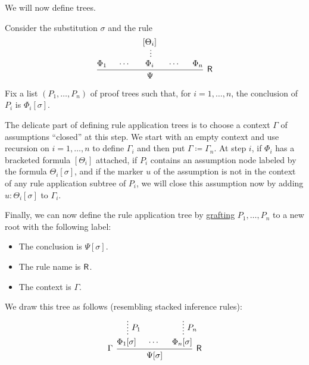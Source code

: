 \begin{definition}
\begin{thmenum}[resume=def:natural_deduction_proof_tree]
     We will now define  trees.

    Consider the substitution \( \sigma \) and the rule
    \begin{equation*}
      \begin{prooftree}
        \hypo{ \Phi_1 }
        \hypo{ \cdots }
        \hypo{ [\Theta_i] }
        \ellipsis {} { \Phi_i }
        \hypo{ \cdots }
        \hypo{ \Phi_n }
        \infer5[\logic{R}]{ \Psi }
      \end{prooftree}
    \end{equation*}

    Fix a list \( (P_1, \ldots, P_n) \) of proof trees such that, for \( i = 1, \ldots, n \), the conclusion of \( P_i \) is \( \Phi_i[\sigma] \).

    The delicate part of defining rule application trees is to choose a context \( \Gamma \) of assumptions \enquote{closed} at this step. We start with an empty context and use recursion on \( i = 1, \ldots, n \) to define \( \Gamma_i \) and then put \( \Gamma \coloneqq \Gamma_n \). At step \( i \), if \( \Phi_i \) has a bracketed formula \( [\Theta_i] \) attached, if \( P_i \) contains an assumption node labeled by the formula \( \Theta_i[\sigma] \), and if the marker \( u \) of the assumption is not in the context of any rule application subtree of \( P_i \), we will close this assumption now by adding \( u: \Theta_i[\sigma] \) to \( \Gamma_i \).

    Finally, we can now define the rule application tree by \hyperref[def:ordered_tree_grafting_product]{grafting} \( P_1, \ldots, P_n \) to a new root with the following label:
    \begin{itemize}
      \item The conclusion is \( \Psi[\sigma] \).
      \item The rule name is \( \textsf{R} \).
      \item The context is \( \Gamma \).
    \end{itemize}

    We draw this tree as follows (resembling stacked inference rules):
    \begin{equation*}
      \begin{prooftree}
        \hypo{}
        \ellipsis { \( P_1 \) } { \Phi_1[\sigma] }

        \hypo{ \cdots }

        \hypo{}
        \ellipsis { \( P_n \) } { \Phi_n[\sigma] }
        \infer[left label=\( \Gamma \)]3[\logic{R}]{ \Psi[\sigma] }
      \end{prooftree}
    \end{equation*}
  \end{thmenum}
\end{definition}
